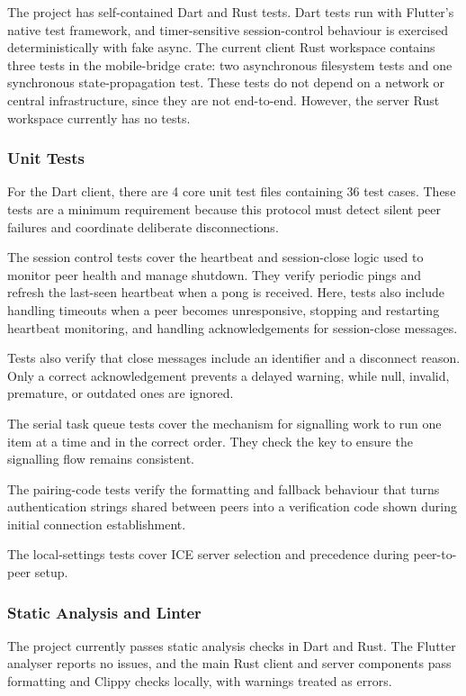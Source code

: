 \documentclass[12pt,a4paper]{article}
\begin{document}
The project has self-contained Dart and Rust tests. Dart tests run with Flutter’s native test framework, and timer-sensitive session-control behaviour is exercised deterministically with fake async. The current client Rust workspace contains three tests in the mobile-bridge crate: two asynchronous filesystem tests and one synchronous state-propagation test. These tests do not depend on a network or central infrastructure, since they are not end-to-end. However, the server Rust workspace currently has no tests.

\subsubsection{Unit Tests}

For the Dart client, there are 4 core unit test files containing 36 test cases. These tests are a minimum requirement because this protocol must detect silent peer failures and coordinate deliberate disconnections.

The session control tests cover the heartbeat and session-close logic used to monitor peer health and manage shutdown. They verify periodic pings and refresh the last-seen heartbeat when a pong is received. Here, tests also include handling timeouts when a peer becomes unresponsive, stopping and restarting heartbeat monitoring, and handling acknowledgements for session-close messages.

Tests also verify that close messages include an identifier and a disconnect reason. Only a correct acknowledgement prevents a delayed warning, while null, invalid, premature, or outdated ones are ignored.

The serial task queue tests cover the mechanism for signalling work to run one item at a time and in the correct order. They check the key to ensure the signalling flow remains consistent.

The pairing-code tests verify the formatting and fallback behaviour that turns authentication strings shared between peers into a verification code shown during initial connection establishment.

The local-settings tests cover ICE server selection and precedence during peer-to-peer setup.

\subsubsection{Static Analysis and Linter}

The project currently passes static analysis checks in Dart and Rust. The Flutter analyser reports no issues, and the main Rust client and server components pass formatting and Clippy checks locally, with warnings treated as errors.
\end{document}
